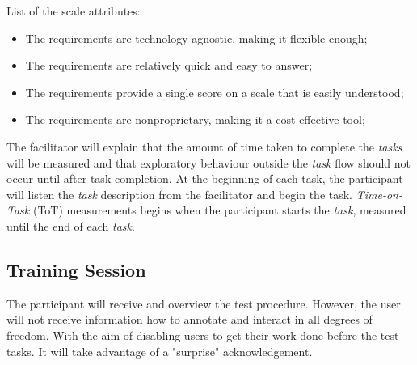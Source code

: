 \hfill


List of the scale attributes:


\hfill

\begin{itemize}
  \item The requirements are technology agnostic, making it flexible enough;
  \item The requirements are relatively quick and easy to answer;
  \item The requirements provide a single score on a scale that is easily understood;
  \item The requirements are nonproprietary, making it a cost effective tool;
\end{itemize}

\hfill


\clearpage

The facilitator will explain that the amount of time taken to complete the \textit{tasks} will be measured and that exploratory behaviour outside the \textit{task} flow should not occur until after task completion. At the beginning of each task, the participant will listen the \textit{task} description from the facilitator and begin the task. \textit{Time-on-Task} (ToT) measurements begins when the participant starts the \textit{task}, measured until the end of each \textit{task}.



\subsection{Training Session}

The participant will receive and overview the test procedure. However, the user will not receive information how to annotate and interact in all degrees of freedom. With the aim of disabling users to get their work done before the test tasks. It will take advantage of a "surprise" acknowledgement.

